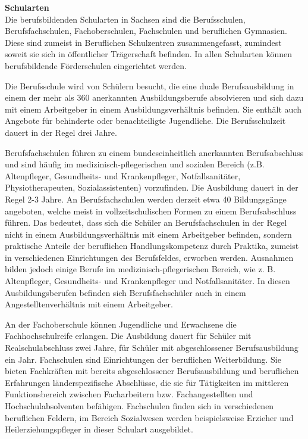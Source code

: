 \textbf{Schularten}\\
Die berufsbildenden Schularten in Sachsen sind die Berufsschulen, Berufsfachschulen, Fachoberschulen, Fachschulen und beruflichen Gymnasien. Diese sind zumeist in Beruflichen Schulzentren zusammengefasst, zumindest soweit sie sich in öffentlicher Trägerschaft befinden. In allen Schularten können berufsbildende Förderschulen eingerichtet werden.

Die Berufsschule wird von Schülern besucht, die eine duale Berufsausbildung in einem der mehr als 360 anerkannten Ausbildungsberufe absolvieren und sich dazu mit einem Arbeitgeber in einem Ausbildungsverhältnis befinden. Sie enthält auch Angebote für behinderte oder benachteiligte Jugendliche. Die Berufsschulzeit dauert in der Regel drei Jahre. 

Berufsfachschulen führen zu einem bundeseinheitlich anerkannten Berufsabschluss und sind häufig im medizinisch-pflegerischen und sozialen Bereich (z.B. Altenpfleger,  Gesundheits- und Krankenpfleger, Notfallsanitäter, Physiotherapeuten, Sozialassistenten) vorzufinden. Die Ausbildung dauert in der Regel 2-3 Jahre. An Berufsfachschulen werden derzeit etwa 40 Bildungsgänge angeboten, welche meist in vollzeitschulischen Formen zu einem Berufsabschluss führen. Das bedeutet, dass sich die Schüler an Berufsfachschulen in der Regel nicht in einem Ausbildungsverhältnis mit einem Arbeitgeber befinden, sondern praktische Anteile der beruflichen Handlungskompetenz durch Praktika, zumeist in verschiedenen Einrichtungen des Berufsfeldes, erworben werden. Ausnahmen bilden jedoch einige Berufe im medizinisch-pflegerischen Bereich, wie z. B. Altenpfleger, Gesundheits- und Krankenpfleger und Notfallsanitäter. In diesen Ausbildungsberufen befinden sich Berufsfachschüler auch in einem Angestelltenverhältnis mit einem Arbeitgeber.
 
An der Fachoberschule können Jugendliche und Erwachsene die Fachhochschulreife erlangen. Die Ausbildung dauert für Schüler mit Realschulabschluss zwei Jahre, für Schüler mit abgeschlossener Berufsausbildung ein Jahr. 
Fachschulen sind Einrichtungen der beruflichen Weiterbildung. Sie bieten Fachkräften mit bereits abgeschlossener Berufsausbildung und beruflichen Erfahrungen länderspezifische Abschlüsse, die sie für Tätigkeiten im mittleren Funktionsbereich zwischen Facharbeitern bzw. Fachangestellten und Hochschulabsolventen befähigen. Fachschulen finden sich in verschiedenen beruflichen Feldern, im Bereich Sozialwesen werden beispielsweise Erzieher und Heilerziehungspfleger in dieser Schulart ausgebildet. 
 

